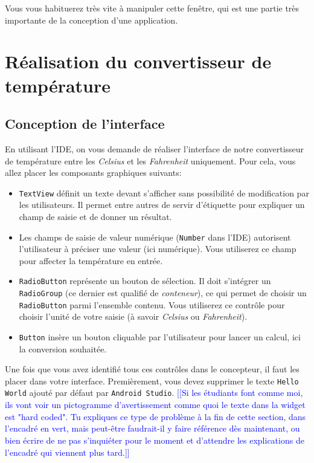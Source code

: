 \documentclass[a4paper,10pt]{article}
\begin{document}
Vous vous habituerez très vite à manipuler cette fenêtre, qui est une partie très importante  de la conception d'une application.

\section{Réalisation du convertisseur de température}

\subsection{Conception de l'interface}

En utilisant l'IDE, on vous demande de réaliser l'interface de notre convertisseur de température entre les \textit{Celsius} et les \textit{Fahrenheit} uniquement. Pour cela, vous allez placer les composants graphiques suivants:
\begin{itemize}
	\item \texttt{TextView} définit un texte devant s'afficher sans possibilité de modification par les utilisateurs. Il permet entre autres de servir d'étiquette pour expliquer un champ de saisie et de donner un résultat.
	\item Les champs de saisie de valeur numérique (\texttt{Number} dans l'IDE) autorisent l'utilisateur à préciser une valeur (ici numérique). Vous utiliserez ce champ pour affecter la température en entrée.
	\item \texttt{RadioButton} représente un bouton de sélection. Il doit s'intégrer un \texttt{RadioGroup} (ce dernier est qualifié de \textit{conteneur}), ce qui permet de choisir un \texttt{RadioButton} parmi l'ensemble contenu. Vous utiliserez ce contrôle pour choisir l'unité de votre saisie (à savoir \textit{Celsius} ou \textit{Fahrenheit}).
	\item \texttt{Button} insère un bouton cliquable par l'utilisateur pour lancer un calcul, ici la conversion souhaitée.
\end{itemize}

Une fois que vous avez identifié tous ces contrôles dans le concepteur, il faut les placer dans votre interface. Premièrement, vous devez supprimer le texte \texttt{Hello World} ajouté par défaut par \texttt{Android Studio}. 
\textcolor{blue}{[[Si les étudiants font comme moi, ils vont voir un pictogramme d'avertissement comme quoi le texte dans la widget est "hard coded". Tu expliques ce type de problème à la fin de cette section, dans l'encadré en vert, mais peut-être faudrait-il y faire référence dès maintenant, ou bien écrire de ne pas s'inquiéter pour le moment et d'attendre les explications de l'encadré qui viennent plus tard.]]}
\end{document}
